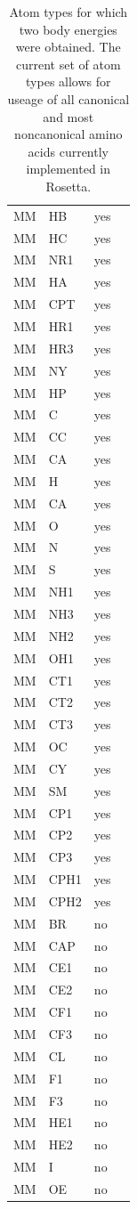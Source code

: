 \begin{table}[!htbp]
\begin{tabular}{c|lll}
MM & HB & yes\\
MM & HC & yes\\
MM & NR1 & yes\\
MM & HA & yes\\
MM & CPT & yes\\
MM & HR1 & yes\\
MM & HR3 & yes\\
MM & NY & yes\\
MM & HP & yes\\
MM & C & yes\\
MM & CC & yes\\
MM & CA & yes\\
MM & H & yes\\
MM & CA & yes\\
MM & O & yes\\
MM & N & yes\\
MM & S & yes\\
MM & NH1 & yes\\
MM & NH3 & yes\\
MM & NH2 & yes\\
MM & OH1 & yes\\
MM & CT1 & yes\\
MM & CT2 & yes\\
MM & CT3 & yes\\
MM & OC & yes\\
MM & CY & yes\\
MM & SM & yes\\
MM & CP1 & yes\\
MM & CP2 & yes\\
MM & CP3 & yes\\
MM & CPH1 & yes\\
MM & CPH2 & yes\\
\hline
MM & BR & no\\
MM & CAP & no\\
MM & CE1 & no\\
MM & CE2 & no\\
MM & CF1 & no\\
MM & CF3 & no\\
MM & CL & no\\
MM & F1 & no\\
MM & F3 & no\\
MM & HE1 & no\\
MM & HE2 & no\\
MM & I & no\\
MM & OE & no\\
\end{tabular}

\fontsize{10pt}{11pt}
\selectfont
\caption{Atom types for which two body energies were obtained. The current set of atom types allows for useage of all canonical and most noncanonical amino acids currently implemented in Rosetta.}
\label{tab:atypes_all}

\end{table}


